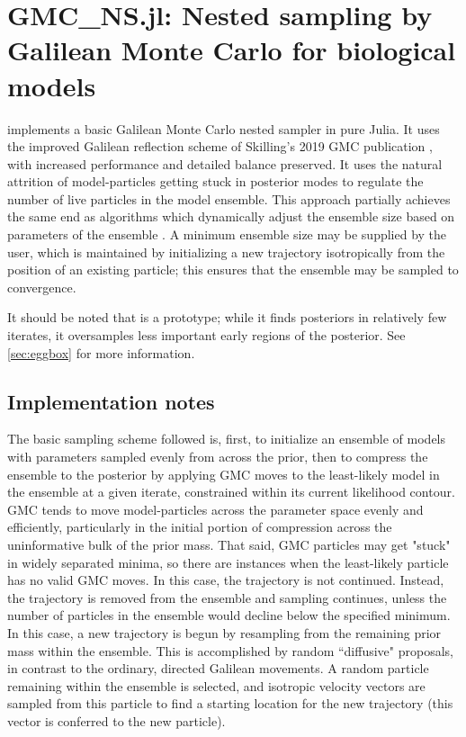 \chapter{GMC\_NS.jl: Nested sampling by Galilean Monte Carlo for biological models}
\label{chap:GMC}
 implements a basic Galilean Monte Carlo nested sampler \cite{Skilling2012,Skilling2019} in pure Julia. It uses the improved Galilean reflection scheme of Skilling's 2019 GMC publication \cite{Skilling2019}, with increased performance and detailed balance preserved. It uses the natural attrition of model-particles getting stuck in posterior modes to regulate the number of live particles in the model ensemble. This approach partially achieves the same end as algorithms which dynamically adjust the ensemble size based on parameters of the ensemble \cite{Feroz2009,Higson2019}. A minimum ensemble size may be supplied by the user, which is maintained by initializing a new trajectory isotropically from the position of an existing particle; this ensures that the ensemble may be sampled to convergence.

It should be noted that  is a prototype; while it finds posteriors in relatively few iterates, it oversamples less important early regions of the posterior. See \autoref{sec:eggbox} for more information.

\section{Implementation notes}

The basic sampling scheme followed is, first, to initialize an ensemble of models with parameters sampled evenly from across the prior, then to compress the ensemble to the posterior by applying GMC moves to the least-likely model in the ensemble at a given iterate, constrained within its current likelihood contour. GMC tends to move model-particles across the parameter space evenly and efficiently, particularly in the initial portion of compression across the uninformative bulk of the prior mass. That said, GMC particles may get "stuck" in widely separated minima, so there are instances when the least-likely particle has no valid GMC moves. In this case, the trajectory is not continued. Instead, the trajectory is removed from the ensemble and sampling continues, unless the number of particles in the ensemble would decline below the specified minimum. In this case, a new trajectory is begun by resampling from the remaining prior mass within the ensemble. This is accomplished by random ``diffusive" proposals, in contrast to the ordinary, directed Galilean movements. A random particle remaining within the ensemble is selected, and isotropic velocity vectors are sampled from this particle to find a starting location for the new trajectory (this vector is conferred to the new particle).

